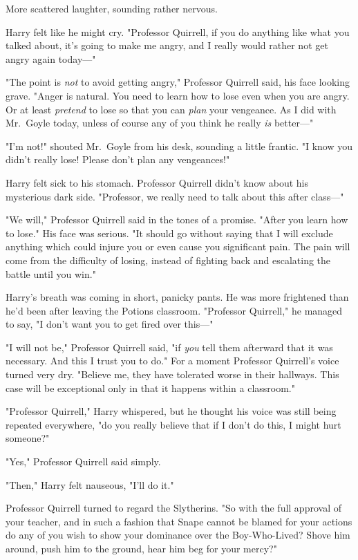 More scattered laughter, sounding rather nervous.

Harry felt like he might cry. "Professor Quirrell, if you do anything like what
you talked about, it's going to make me angry, and I really would rather not
get angry again today---"

"The point is \emph{not} to avoid getting angry," Professor Quirrell said, his
face looking grave. "Anger is natural. You need to learn how to lose even when
you are angry. Or at least \emph{pretend} to lose so that you can \emph{plan}
your vengeance. As I did with Mr.~Goyle today, unless of course any of you
think he really \emph{is} better---"

"I'm not!" shouted Mr.~Goyle from his desk, sounding a little frantic. "I know
you didn't really lose! Please don't plan any vengeances!"

Harry felt sick to his stomach. Professor Quirrell didn't know about his
mysterious dark side. "Professor, we really need to talk about this after
class---"

"We will," Professor Quirrell said in the tones of a promise. "After you learn
how to lose." His face was serious. "It should go without saying that I will
exclude anything which could injure you or even cause you significant pain. The
pain will come from the difficulty of losing, instead of fighting back and
escalating the battle until you win."

Harry's breath was coming in short, panicky pants. He was more frightened than
he'd been after leaving the Potions classroom. "Professor Quirrell," he managed
to say, "I don't want you to get fired over this---"

"I will not be," Professor Quirrell said, "if \emph{you} tell them afterward
that it was necessary. And this I trust you to do." For a moment Professor
Quirrell's voice turned very dry. "Believe me, they have tolerated worse in
their hallways. This case will be exceptional only in that it happens within a
classroom."

"Professor Quirrell," Harry whispered, but he thought his voice was still being
repeated everywhere, "do you really believe that if I don't do this, I might
hurt someone?"

"Yes," Professor Quirrell said simply.

"Then," Harry felt nauseous, "I'll do it."

Professor Quirrell turned to regard the Slytherins. "So{\el} with the full
approval of your teacher, and in such a fashion that Snape cannot be blamed for
your actions{\el} do any of you wish to show your dominance over the
Boy-Who-Lived? Shove him around, push him to the ground, hear him beg for your
mercy?"

